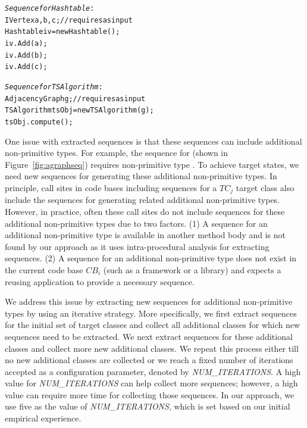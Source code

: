 \begin{CodeOut}
\begin{alltt}
\emph{Sequence for Hashtable}:
\hspace*{0.3in}IVertex a,b,c; //requires as input
\hspace*{0.3in}Hashtable iv = new Hashtable();
\hspace*{0.3in}iv.Add(a);
\hspace*{0.3in}iv.Add(b);
\hspace*{0.3in}iv.Add(c);

\emph{Sequence for TSAlgorithm}:
\hspace*{0.3in}AdjacencyGraph g; //requires as input
\hspace*{0.3in}TSAlgorithm tsObj = new TSAlgorithm(g);
\hspace*{0.3in}tsObj.compute();
\end{alltt}
\end{CodeOut}

One issue with extracted sequences is that these sequences can include additional non-primitive types. For example, the  sequence for  (shown in Figure~\ref{fig:agraphseq}) requires non-primitive type . To achieve target states, we need new sequences for generating these additional non-primitive types. In principle, call sites in code bases including sequences for a $TC_j$ target class also include the sequences for generating related additional non-primitive types. However, in practice, often these call sites do not include sequences for these additional non-primitive types due to two factors. (1) A sequence for an additional non-primitive type is available in another method body and is not found by our approach as it uses intra-procedural analysis for extracting sequences.  (2) A sequence for an additional non-primitive type does not exist in the current code base $CB_i$ (such as a framework or a library) and expects a reusing application to provide a necessary sequence. 

We address this issue by extracting new sequences for additional non-primitive types by using an iterative strategy. More specifically, we first extract sequences for the initial set of target classes and collect all additional classes for which new sequences need to be extracted. We next extract sequences for these additional classes and collect more new additional classes. We repeat this process either till no new additional classes are collected or we reach a fixed number of iterations accepted as a configuration parameter, denoted by \emph{NUM\_ITERATIONS}. A high value for \emph{NUM\_ITERATIONS} can help collect more sequences; however, a high value can require more time for collecting those sequences. In our approach, we use five as the value of \emph{NUM\_ITERATIONS}, which is set based on our initial empirical experience.

